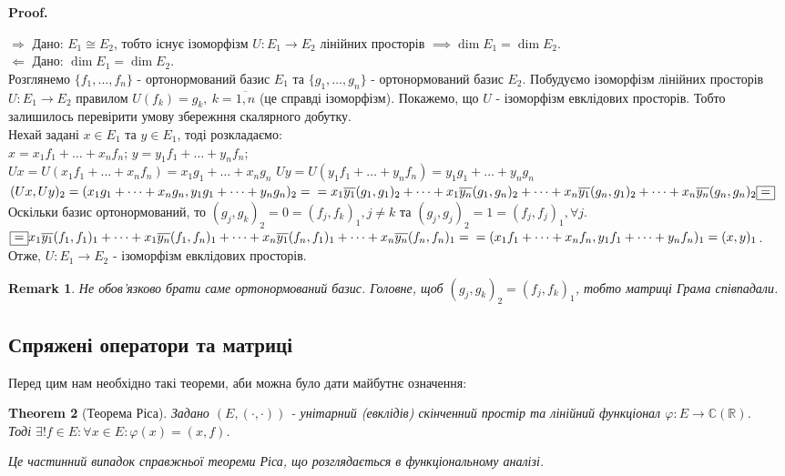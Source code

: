\documentclass[a4paper, 10pt]{article}
\makeatletter
\def\rightproof{$\boxed{\Rightarrow}$ }
\def\leftproof{$\boxed{\Leftarrow}$ }
\theoremstyle{theoremdd}
\newtheorem{theorem}{Theorem}[subsection]
\newtheorem{remark}[theorem]{Remark}
\renewenvironment{proof}[1][Proof.\\]{\par
\pushQED{\hfill \qed}%
\normalfont \topsep6\p@\@plus6\p@\relax
\trivlist
\item\relax
{\bfseries
#1\@addpunct{.}}\hspace\labelsep\ignorespaces
}{%
\popQED\endtrivlist\@endpefalse
}
\makeatother
\begin{document}
\begin{proof}
\rightproof Дано: $E_1 \cong E_2$, тобто існує ізоморфізм $U \colon E_1 \to E_2$ лінійних просторів $\implies \dim E_1 = \dim E_2$.
\bigskip \\
\leftproof Дано: $\dim E_1 = \dim E_2$.\\
Розглянемо $\{f_1,\dots,f_n\}$ - ортонормований базис $E_1$ та $\{g_1,\dots,g_n\}$ - ортонормований базис $E_2$.
Побудуємо ізоморфізм лінійних просторів $U \colon E_1 \to E_2$ правилом $U(f_k) = g_k,\ k = \overline{1,n}$ (це справді ізоморфізм). Покажемо, що $U$ - ізоморфізм евклідових просторів. Тобто залишилось перевірити умову збережння скалярного добутку.\\
Нехай задані $x \in E_1$ та $y \in E_1$, тоді розкладаємо:\\
$x = x_1 f_1 + \dots + x_n f_n$; \hspace{5cm} $y = y_1 f_1 + \dots + y_n f_n$;\\
$Ux = U(x_1 f_1+\dots+x_n f_n) = x_1 g_1 + \dots + x_n g_n$ \hspace{1cm} $Uy = U(y_1 f_1+\dots+y_n f_n) = y_1 g_1 + \dots + y_n g_n$\\
$(Ux,Uy)_2 = (x_1 g_1+\dots+x_n g_n, y_1 g_1 + \dots + y_n g_n)_2 = \\
= x_1 \overline{y_1} (g_1,g_1)_2 + \dots + x_1 \overline{y_n} (g_1,g_n)_2 + \dots + x_n \overline{y_1} (g_n, g_1)_2 + \dots + x_n \overline{y_n} (g_n,g_n)_2 \boxed{=}$\\
Оскільки базис ортонормований, то $(g_j,g_k)_2 = 0 = (f_j,f_k)_1, j \neq k$ та $(g_j,g_j)_2 = 1 = (f_j,f_j)_1, \forall j$.\\
$\boxed{=} x_1 \overline{y_1} (f_1,f_1)_1 + \dots + x_1 \overline{y_n} (f_1,f_n)_1 + \dots + x_n \overline{y_1} (f_n, f_1)_1 + \dots + x_n \overline{y_n} (f_n,f_n)_1 = \\
= (x_1f_1+\dots+x_nf_n, y_1f_1+\dots+y_nf_n)_1 = (x,y)_1$.\\
Отже, $U \colon E_1 \to E_2$ - ізоморфізм евклідових просторів.
\end{proof}

\begin{remark}
Не обов'язково брати саме ортонормований базис. Головне, щоб $(g_j,g_k)_2 = (f_j,f_k)_1$, тобто матриці Грама співпадали.
\end{remark}

\subsection{Спряжені оператори та матриці}
Перед цим нам необхідно такі теореми, аби можна було дати майбутнє означення:
\begin{theorem}[Теорема Ріса]
Задано $(E,(\cdot,\cdot))$ - унітарний (евклідів) скінченний простір та лінійний функціонал $\varphi \colon E \to \mathbb{C} (\mathbb{R})$. \\ Тоді $\exists ! f \in E: \forall x \in E: \varphi(x) = (x,f)$.
\end{theorem}
\noindent
\textit{Це частинний випадок справжньої теореми Ріса, що розглядається в функціональному аналізі.}
\end{document}
